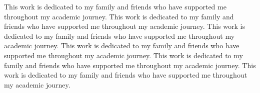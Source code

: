    \noindent
This work is dedicated to my family and friends who have supported me throughout my academic journey. This work is dedicated to my family and friends who have supported me throughout my academic journey. This work is dedicated to my family and friends who have supported me throughout my academic journey. This work is dedicated to my family and friends who have supported me throughout my academic journey. This work is dedicated to my family and friends who have supported me throughout my academic journey. This work is dedicated to my family and friends who have supported me throughout my academic journey.

